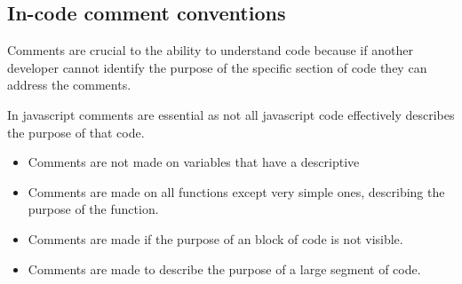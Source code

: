 \documentclass[11pt]{article}
\begin{document}
	\subsection{In-code comment conventions}
	Comments are crucial to the ability to understand code because if another developer cannot identify the purpose of the specific section of code they can address the comments.
	
	In javascript comments are essential as not all javascript code effectively describes the purpose of that code.
	\begin{itemize}
		\item Comments are not made on variables that have a descriptive
		\item Comments are made on all functions except very simple ones, describing the purpose of the function.
		\item Comments are made if the purpose of an block of code is not visible.
		\item Comments are made to describe the purpose of a large segment of code.
	\end{itemize}
	
	
\end{document}
